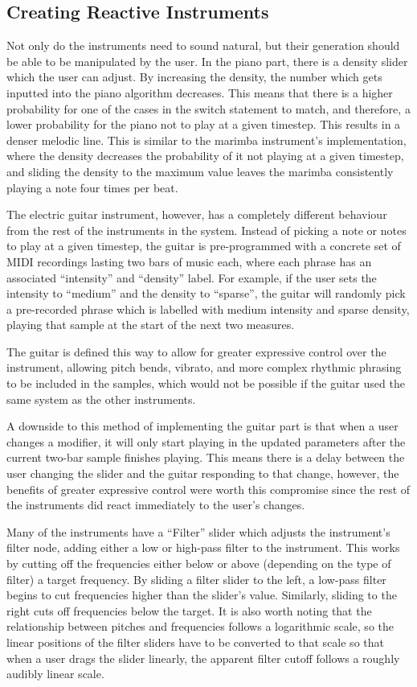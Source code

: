 \subsection{Creating Reactive Instruments}
Not only do the instruments need to sound natural, but their generation should be able to be manipulated by the user. In the piano part, there is a density slider which the user can adjust. By increasing the density, the number which gets inputted into the piano algorithm decreases. This means that there is a higher probability for one of the cases in the switch statement to match, and therefore, a lower probability for the piano not to play at a given timestep. This results in a denser melodic line. This is similar to the marimba instrument’s implementation, where the density decreases the probability of it not playing at a given timestep, and sliding the density to the maximum value leaves the marimba consistently playing a note four times per beat.

The electric guitar instrument, however, has a completely different behaviour from the rest of the instruments in the system. Instead of picking a note or notes to play at a given timestep, the guitar is pre-programmed with a concrete set of MIDI recordings lasting two bars of music each, where each phrase has an associated “intensity” and “density” label. For example, if the user sets the intensity to “medium” and the density to “sparse”, the guitar will randomly pick a pre-recorded phrase which is labelled with medium intensity and sparse density, playing that sample at the start of the next two measures.

The guitar is defined this way to allow for greater expressive control over the instrument, allowing pitch bends, vibrato, and more complex rhythmic phrasing to be included in the samples, which would not be possible if the guitar used the same system as the other instruments.

A downside to this method of implementing the guitar part is that when a user changes a modifier, it will only start playing in the updated parameters after the current two-bar sample finishes playing. This means there is a delay between the user changing the slider and the guitar responding to that change, however, the benefits of greater expressive control were worth this compromise since the rest of the instruments did react immediately to the user’s changes.

Many of the instruments have a “Filter” slider which adjusts the instrument’s filter node, adding either a low or high-pass filter to the instrument. This works by cutting off the frequencies either below or above (depending on the type of filter) a target frequency. By sliding a filter slider to the left, a low-pass filter begins to cut frequencies higher than the slider’s value. Similarly, sliding to the right cuts off frequencies below the target. It is also worth noting that the relationship between pitches and frequencies follows a logarithmic scale, so the linear positions of the filter sliders have to be converted to that scale so that when a user drags the slider linearly, the apparent filter cutoff follows a roughly audibly linear scale.

